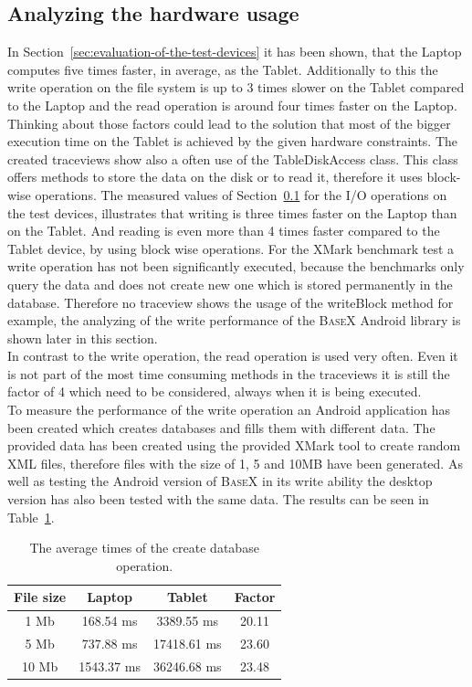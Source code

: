 \subsection{Analyzing the hardware usage}
\label{sec:analyzing-the-hardware-usage}
In Section~\ref{sec:evaluation-of-the-test-devices} it has been shown, that the Laptop computes five times faster, in average, as the Tablet.
Additionally to this the write operation on the file system is up to 3 times slower on the Tablet compared to the Laptop and the read operation is around four times faster on the Laptop.
Thinking about those factors could lead to the solution that most of the bigger execution time on the Tablet is achieved by the given hardware constraints.
The created traceviews show also a often use of the \textsf{TableDiskAccess} class.
This class offers methods to store the data on the disk or to read it, therefore it uses block-wise operations.
The measured values of Section~\ref{sec:analyzing-the-hardware-usage} for the I/O operations on the test devices, illustrates that writing is three times faster on the Laptop than on the Tablet.
And reading is even more than 4 times faster compared to the Tablet device, by using block wise operations.
For the XMark benchmark test a write operation has not been significantly executed, because the benchmarks only query the data and does not create new one which is stored permanently in the database.
Therefore no traceview shows the usage of the \textsf{writeBlock} method for example, the analyzing of the write performance of the \textsc{BaseX} Android library is shown later in this section.\\
In contrast to the write operation, the read operation is used very often.
Even it is not part of the most time consuming methods in the traceviews it is still the factor of 4 which need to be considered, always when it is being executed.\\
To measure the performance of the write operation an Android application has been created which creates databases and fills them with different data.
The provided data has been created using the provided XMark tool to create random XML files, therefore files with the size of 1, 5 and 10MB have been generated.
As well as testing the Android version of \textsc{BaseX} in its write ability the desktop version has also been tested with the same data.
The results can be seen in Table~\ref{tab:average-times-create-db}.
\begin{table}[htpb]
	\centering
	\begin{tabular}{|c|c|c||c|}
		\hline
		File size&Laptop&Tablet&Factor\\
		\hline
		1 Mb&168.54 ms&3389.55 ms&20.11\\
		\hline
		5 Mb&737.88 ms&17418.61 ms&23.60\\
		\hline
		10 Mb&1543.37 ms&36246.68 ms&23.48\\
		\hline
	\end{tabular}
	\caption{The average times of the create database operation.}
	\label{tab:average-times-create-db}
\end{table}

